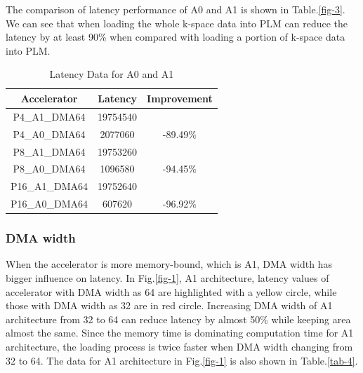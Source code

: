 \documentclass{sig-alternate}
\begin{document}
The comparison of latency performance of A0 and A1 is shown in Table.\ref{fig-3}. We can see that when loading the whole k-space data into PLM can reduce the latency by at least 90\% when compared with loading a portion of k-space data into PLM.

\begin{table}[ht!]
    \centering
    \begin{tabular}{c|c|c}
    \hline
    Accelerator & Latency & Improvement \\
    \hline
    P4\_A1\_DMA64  &  19754540 &      \\                                        
    P4\_A0\_DMA64  &  2077060 &       -89.49\% \\                               
    \hline
    P8\_A1\_DMA64  &  19753260 &      \\
    P8\_A0\_DMA64  &  1096580  &      -94.45\% \\
    \hline
    P16\_A1\_DMA64  & 19752640 &      \\
    P16\_A0\_DMA64  & 607620  &      -96.92\% \\
    \hline
    \end{tabular}
    \caption{Latency Data for A0 and A1}
    \label{tab-3}
\end{table}

\subsubsection{DMA width}
When the accelerator is more memory-bound, which is A1, DMA width has bigger influence on latency. In Fig.\ref{fig-1}, A1 architecture, latency values of accelerator with DMA width as 64 are highlighted with a yellow circle, while those with DMA width as 32 are in red circle. Increasing DMA width of A1 architecture from 32 to 64 can reduce latency by almost 50\% while keeping area almost the same. Since the memory time is dominating computation time for A1 architecture, the loading process is twice faster when DMA width changing from 32 to 64. The data for A1 architecture in Fig.\ref{fig-1} is also shown in Table.\ref{tab-4}. \\
\end{document}
